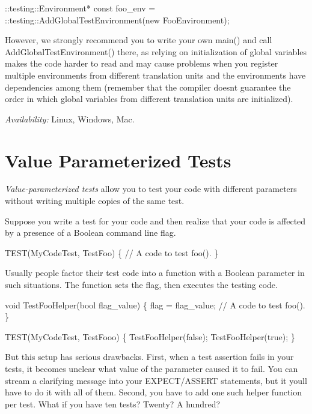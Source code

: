 \begin{DoxyCode}
::testing::Environment* const foo\_env = ::testing::AddGlobalTestEnvironment(new FooEnvironment);
\end{DoxyCode}


However, we strongly recommend you to write your own {\ttfamily main()} and call {\ttfamily Add\+Global\+Test\+Environment()} there, as relying on initialization of global variables makes the code harder to read and may cause problems when you register multiple environments from different translation units and the environments have dependencies among them (remember that the compiler doesn\textquotesingle{}t guarantee the order in which global variables from different translation units are initialized).

{\itshape Availability\+:} Linux, Windows, Mac.

\section*{Value Parameterized Tests}

{\itshape Value-\/parameterized tests} allow you to test your code with different parameters without writing multiple copies of the same test.

Suppose you write a test for your code and then realize that your code is affected by a presence of a Boolean command line flag.


\begin{DoxyCode}
TEST(MyCodeTest, TestFoo) \{
  // A code to test foo().
\}
\end{DoxyCode}


Usually people factor their test code into a function with a Boolean parameter in such situations. The function sets the flag, then executes the testing code.


\begin{DoxyCode}
void TestFooHelper(bool flag\_value) \{
  flag = flag\_value;
  // A code to test foo().
\}

TEST(MyCodeTest, TestFooo) \{
  TestFooHelper(false);
  TestFooHelper(true);
\}
\end{DoxyCode}


But this setup has serious drawbacks. First, when a test assertion fails in your tests, it becomes unclear what value of the parameter caused it to fail. You can stream a clarifying message into your {\ttfamily E\+X\+P\+E\+CT}/{\ttfamily A\+S\+S\+E\+RT} statements, but it you\textquotesingle{}ll have to do it with all of them. Second, you have to add one such helper function per test. What if you have ten tests? Twenty? A hundred?

